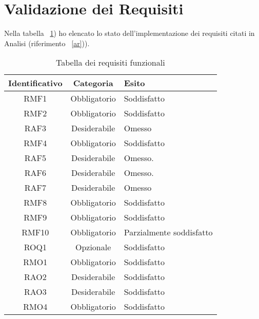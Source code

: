 \section{Validazione dei Requisiti}
\label{val-req}

Nella tabella ~\ref{tab:validazione-requisiti}) ho elencato lo stato dell'implementazione dei requisiti citati in Analisi (riferimento ~\ref{ar})).

\begin{table}[H]
\caption{Tabella dei requisiti funzionali}
\label{tab:validazione-requisiti}
\begin{tabularx}{\linewidth}{|c|c|X|}
\hline
\textbf{Identificativo} & \textbf{Categoria} & \textbf{Esito} \\
\hline
RMF1 & Obbligatorio & Soddisfatto \\
\hline
RMF2 & Obbligatorio & Soddisfatto \\
\hline
RAF3 & Desiderabile & Omesso \\
\hline
RMF4 & Obbligatorio & Soddisfatto \\
\hline
RAF5 & Desiderabile & Omesso. \\
\hline
RAF6 & Desiderabile & Omesso. \\
\hline
RAF7 & Desiderabile & Omesso \\
\hline
RMF8 & Obbligatorio & Soddisfatto \\
\hline
RMF9 & Obbligatorio & Soddisfatto \\
\hline
RMF10 & Obbligatorio & Parzialmente soddisfatto \\
\hline
ROQ1 & Opzionale & Soddisfatto \\
\hline
RMO1 & Obbligatorio & Soddisfatto \\
\hline
RAO2 & Desiderabile & Soddisfatto \\
\hline
RAO3 & Desiderabile & Soddisfatto \\
\hline
RMO4 & Obbligatorio & Soddisfatto \\
\hline
\end{tabularx}
\end{table}

